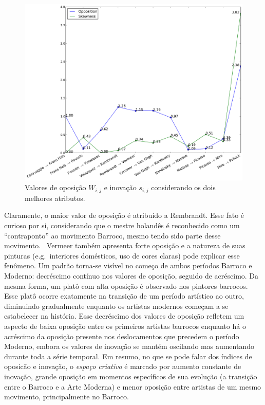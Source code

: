 \begin{figure}[h!]
\begin{center}
        \includegraphics[width=\columnwidth]{figs/caso1_oposEinov}
      \caption{Valores de oposição $W_{i,j}$ e inovação $s_{i,j}$ considerando
        os dois melhores atributos.}
        \label{fig:caso1_oposEinov}
\end{center}
\end{figure}

Claramente, o maior valor de oposição é atribuído a Rembrandt. Esse
fato é curioso por si, considerando que o mestre holandês é
reconhecido como um ``contraponto'' ao movimento Barroco, mesmo tendo
sido parte desse movimento.~\cite{gombrich} Vermeer também apresenta
forte oposição e a natureza de suas pinturas (e.g.\ interiores
domésticos, uso de cores claras) pode explicar esse fenômeno. Um
padrão torna-se visível no começo de ambos períodos Barroco e Moderno:
decréscimo contínuo nos valores de oposição, seguido de acréscimo. Da
mesma forma, um platô com alta oposição é observado nos pintores
barrocos. Esse platô ocorre exatamente na transição de um período
artístico ao outro, diminuindo gradualmente enquanto os artistas
modernos começam a se estabelecer na história. Esse decréscimo dos
valores de oposição refletem um aspecto de baixa oposição entre os
primeiros artistas barrocos enquanto há o acréscimo da oposição
presente nos deslocamentos que precedem o período Moderno, embora os
valores de inovação se mantém oscilando mas aumentando durante toda a
série temporal. 
Em resumo, no que se pode falar dos índices de oposicão e
inovação, o \textit{espaço criativo} é marcado por aumento constante
de inovação, grande oposição em momentos específicos de sua evolução
(a transição entre o Barroco e a Arte Moderna) e menor oposição entre
artistas de um mesmo movimento, principalmente no Barroco.

